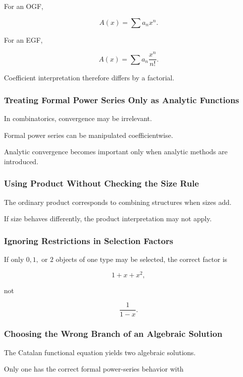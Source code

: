 For an OGF,

\[
A(x)
=
\sum a_nx^n.
\]

For an EGF,

\[
A(x)
=
\sum a_n\frac{x^n}{n!}.
\]

Coefficient interpretation therefore differs by a factorial.

\subsubsection{Treating Formal Power Series Only as Analytic Functions}

In combinatorics, convergence may be irrelevant.

Formal power series can be manipulated coefficientwise.

Analytic convergence becomes important only when analytic methods are
introduced.

\subsubsection{Using Product Without Checking the Size Rule}

The ordinary product corresponds to combining structures when sizes
add.

If size behaves differently, the product interpretation may not apply.

\subsubsection{Ignoring Restrictions in Selection Factors}

If only \(0,1,\) or \(2\) objects of one type may be selected, the
correct factor is

\[
1+x+x^2,
\]

not

\[
\frac{1}{1-x}.
\]

\subsubsection{Choosing the Wrong Branch of an Algebraic Solution}

The Catalan functional equation yields two algebraic solutions.

Only one has the correct formal power-series behavior with

